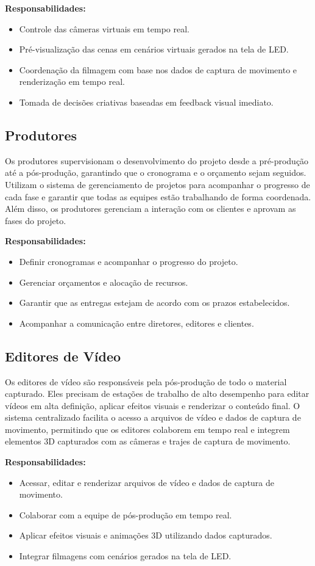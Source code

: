 \textbf{Responsabilidades:}
\begin{itemize}
  \item Controle das câmeras virtuais em tempo real.
  \item Pré-visualização das cenas em cenários virtuais gerados na tela de LED.
  \item Coordenação da filmagem com base nos dados de captura de movimento e renderização em tempo real.
  \item Tomada de decisões criativas baseadas em feedback visual imediato.
\end{itemize}

\subsection{Produtores}
Os produtores supervisionam o desenvolvimento do projeto desde a pré-produção até a pós-produção, garantindo que o cronograma e o orçamento sejam seguidos. Utilizam o sistema de gerenciamento de projetos para acompanhar o progresso de cada fase e garantir que todas as equipes estão trabalhando de forma coordenada. Além disso, os produtores gerenciam a interação com os clientes e aprovam as fases do projeto.

\textbf{Responsabilidades:}
\begin{itemize}
  \item Definir cronogramas e acompanhar o progresso do projeto.
  \item Gerenciar orçamentos e alocação de recursos.
  \item Garantir que as entregas estejam de acordo com os prazos estabelecidos.
  \item Acompanhar a comunicação entre diretores, editores e clientes.
\end{itemize}

\subsection{Editores de Vídeo}
Os editores de vídeo são responsáveis pela pós-produção de todo o material capturado. Eles precisam de estações de trabalho de alto desempenho para editar vídeos em alta definição, aplicar efeitos visuais e renderizar o conteúdo final. O sistema centralizado facilita o acesso a arquivos de vídeo e dados de captura de movimento, permitindo que os editores colaborem em tempo real e integrem elementos 3D capturados com as câmeras e trajes de captura de movimento.

\textbf{Responsabilidades:}
\begin{itemize}
  \item Acessar, editar e renderizar arquivos de vídeo e dados de captura de movimento.
  \item Colaborar com a equipe de pós-produção em tempo real.
  \item Aplicar efeitos visuais e animações 3D utilizando dados capturados.
  \item Integrar filmagens com cenários gerados na tela de LED.
\end{itemize}

